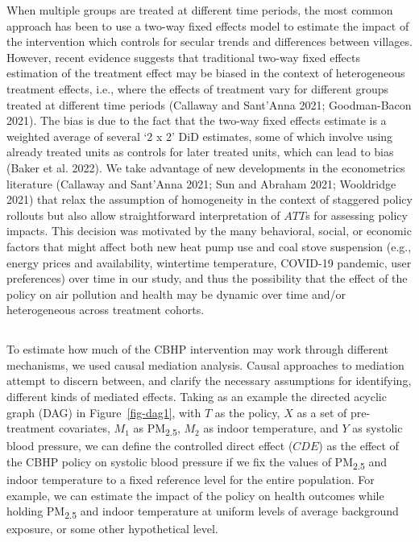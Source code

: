 \documentclass[
  letterpaper,
  DIV=11,
  numbers=noendperiod]{scrartcl}
\providecommand{\DIFadd}[1]{{\protect\color{blue}\uwave{#1}}} %
\providecommand{\DIFaddbegin}{} %
\providecommand{\DIFaddend}{} %
\providecommand{\DIFdelbegin}{} %
\providecommand{\DIFdelend}{} %
\newcommand{\DIFscaledelfig}{0.5}
\newlength{\DIFdelgraphicswidth} %
\newlength{\DIFdelgraphicsheight} %
\newcommand{\DIFaddincludegraphics}[2][]{{\color{blue}\fbox{\DIFOincludegraphics[#1]{#2}}}} %
\newcommand{\DIFdelincludegraphics}[2][]{%
\sbox{\DIFdelgraphicsbox}{\DIFOincludegraphics[#1]{#2}}%
\settoboxwidth{\DIFdelgraphicswidth}{\DIFdelgraphicsbox} %
\settoboxtotalheight{\DIFdelgraphicsheight}{\DIFdelgraphicsbox} %
\scalebox{\DIFscaledelfig}{%
\parbox[b]{\DIFdelgraphicswidth}{\usebox{\DIFdelgraphicsbox}\\[-\baselineskip] \rule{\DIFdelgraphicswidth}{0em}}\llap{\resizebox{\DIFdelgraphicswidth}{\DIFdelgraphicsheight}{%
\setlength{\unitlength}{\DIFdelgraphicswidth}%
\begin{picture}(1,1)%
\thicklines\linethickness{2pt} %
{\color[rgb]{1,0,0}\put(0,0){\framebox(1,1){}}}%
{\color[rgb]{1,0,0}\put(0,0){\line( 1,1){1}}}%
{\color[rgb]{1,0,0}\put(0,1){\line(1,-1){1}}}%
\end{picture}%
}\hspace*{3pt}}} %
} %
\DeclareRobustCommand{\DIFaddbegin}{\DIFOaddbegin \let\includegraphics\DIFaddincludegraphics} %
\DeclareRobustCommand{\DIFaddend}{\DIFOaddend \let\includegraphics\DIFOincludegraphics} %
\DeclareRobustCommand{\DIFdelbegin}{\DIFOdelbegin \let\includegraphics\DIFdelincludegraphics} %
\DeclareRobustCommand{\DIFdelend}{\DIFOaddend \let\includegraphics\DIFOincludegraphics} %
\begin{document}
When multiple groups are treated at different time periods, the most
common approach has been to use a two-way fixed effects model to
estimate the impact of the intervention which controls for secular
trends and differences between villages. However, recent evidence
suggests that traditional two-way fixed effects estimation of the
treatment effect may be biased in the context of heterogeneous treatment
effects, i.e., where the effects of treatment vary for different groups
treated at different time periods (Callaway and Sant'Anna 2021;
Goodman-Bacon 2021). The bias is due to the fact that the two-way fixed
effects estimate is a weighted average of several `2 x 2' DiD estimates,
some of which involve using already treated units as controls for later
treated units, which can lead to bias (Baker et al. 2022). We take
advantage of new developments in the econometrics literature (Callaway
and Sant'Anna 2021; Sun and Abraham 2021; Wooldridge 2021) that relax
the assumption of homogeneity in the context of staggered policy
rollouts but also allow straightforward interpretation of \(ATT\)s for
assessing policy impacts. This decision was motivated by the many
behavioral, social, or economic factors that might affect both new heat
pump use and coal stove suspension (e.g., energy prices and
availability, wintertime temperature, COVID-19 pandemic, user
preferences) over time in our study, and thus the possibility that the
effect of the policy on air pollution and health may be dynamic over
time and/or heterogeneous across treatment cohorts.

\DIFdelbegin %
\DIFdelend \DIFaddbegin \subsection{\DIFadd{Measuring pathways and
mechanisms}}\label{measuring-pathways-and-mechanisms}
\DIFaddend 

To estimate how much of the CBHP intervention may work through different
mechanisms, we used causal mediation analysis. Causal approaches to
mediation attempt to discern between, and clarify the necessary
assumptions for identifying, different kinds of mediated effects. Taking
as an example the directed acyclic graph (DAG) in Figure~\ref{fig-dag1},
with \(T\) as the policy, \(X\) as a set of pre-treatment covariates,
\(M_{1}\) as PM\textsubscript{2.5}, \(M_{2}\) as indoor temperature, and
\(Y\) as systolic blood pressure, we can define the controlled direct
effect (\(CDE\)) as the effect of the CBHP policy on systolic blood
pressure if we fix the values of PM\textsubscript{2.5} and indoor
temperature to a fixed reference level for the entire population. For
example, we can estimate the impact of the policy on health outcomes
while holding PM\textsubscript{2.5} and indoor temperature at uniform
levels of average background exposure, or some other hypothetical level.
\end{document}
